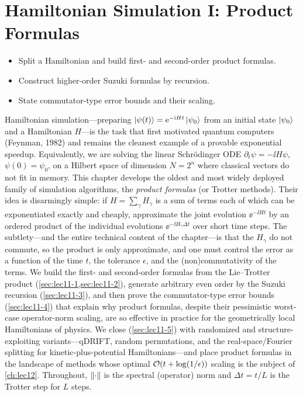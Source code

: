 \chapter{Hamiltonian Simulation I: Product Formulas}
\label{ch:lec11}

\begin{objectives}
\begin{itemize}[leftmargin=1.4em,nosep]
  \item Split a Hamiltonian and build first- and second-order product formulas.
  \item Construct higher-order Suzuki formulas by recursion.
  \item State commutator-type error bounds and their scaling.
\end{itemize}
\end{objectives}

Hamiltonian simulation---preparing $\ket{\psi(t)}=\mathrm{e}^{-\mathrm{i} Ht}\ket{\psi_0}$ from an
initial state $\ket{\psi_0}$ and a Hamiltonian $H$---is the task that first motivated
quantum computers (Feynman, 1982) and remains the cleanest example of a provable
exponential speedup. Equivalently, we are solving the linear Schr\"odinger ODE
$\partial_t\psi=-\ii H\psi$, $\psi(0)=\psi_0$, on a Hilbert space of dimension $N=2^n$
where classical vectors do not fit in memory. This chapter develops the oldest and most
widely deployed family of simulation algorithms, the \emph{product formulas} (or Trotter
methods). Their idea is disarmingly simple: if $H=\sum_\gamma H_\gamma$ is a sum of terms
each of which can be exponentiated exactly and cheaply, approximate the joint evolution
$\ee^{-\ii Ht}$ by an ordered product of the individual evolutions
$\ee^{-\ii H_\gamma\Delta t}$ over short time steps. The subtlety---and the entire
technical content of the chapter---is that the $H_\gamma$ do not commute, so the product
is only approximate, and one must control the error as a function of the time $t$, the
tolerance $\epsilon$, and the (non)commutativity of the terms. We build the first- and
second-order formulas from the Lie--Trotter product (\cref{sec:lec11-1,sec:lec11-2}),
generate arbitrary even order by the Suzuki recursion (\cref{sec:lec11-3}), and then
prove the commutator-type error bounds (\cref{sec:lec11-4}) that explain why product
formulas, despite their pessimistic worst-case operator-norm scaling, are so effective in
practice for the geometrically local Hamiltonians of physics. We close
(\cref{sec:lec11-5}) with randomized and structure-exploiting variants---qDRIFT, random
permutations, and the real-space/Fourier splitting for kinetic-plus-potential
Hamiltonians---and place product formulas in the landscape of methods whose optimal
$\mathcal{O}(t+\log(1/\epsilon))$ scaling is the subject of \cref{ch:lec12}. Throughout,
$\left\lVert \cdot \right\rVert$ is the spectral (operator) norm and $\Delta t=t/L$ is the Trotter step for
$L$ steps.


